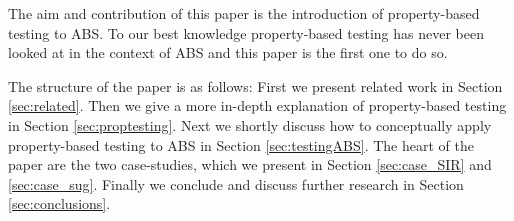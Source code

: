 The aim and contribution of this paper is the introduction of property-based testing to ABS. To our best knowledge property-based testing has never been looked at in the context of ABS and this paper is the first one to do so.

The structure of the paper is as follows: First we present related work in Section \ref{sec:related}. Then we give a more in-depth explanation of property-based testing in Section \ref{sec:proptesting}. Next we shortly discuss how to conceptually apply property-based testing to ABS in Section \ref{sec:testingABS}. The heart of the paper are the two case-studies, which we present in Section \ref{sec:case_SIR} and \ref{sec:case_sug}. Finally we conclude and discuss further research in Section \ref{sec:conclusions}.